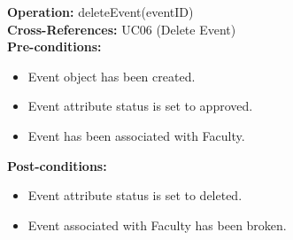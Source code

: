 \textbf{Operation:} deleteEvent(eventID) \\
\textbf{Cross-References:} UC06 (Delete Event) \\
\textbf{Pre-conditions:}
\begin{itemize}
    \item Event object has been created.
    \item Event attribute status is set to approved.
    \item Event has been associated with Faculty.
\end{itemize}
\textbf{Post-conditions:}
\begin{itemize}
    \item Event attribute status is set to deleted.
    \item Event associated with Faculty has been broken.
\end{itemize}